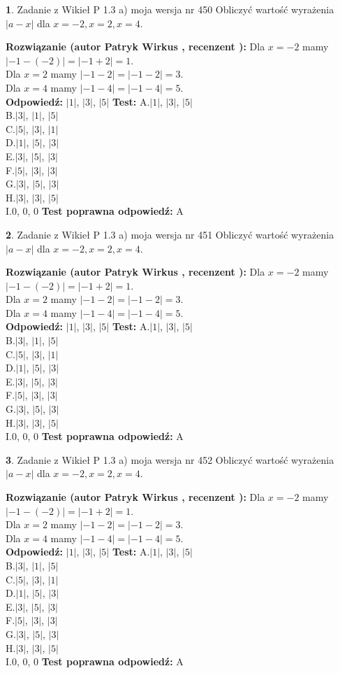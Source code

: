 \documentclass[12pt, a4paper]{article}
\theoremstyle{definition} %
\newtheorem{zad}{}
\newcommand{\zadStart}[1]{\begin{zad}#1\newline}
\newcommand{\zadStop}{\end{zad}}
\newcommand{\rozwStart}[2]{\noindent \textbf{Rozwiązanie (autor #1 , recenzent #2): }\newline}
\newcommand{\rozwStop}{\newline}
\newcommand{\odpStart}{\noindent \textbf{Odpowiedź:}\newline}
\newcommand{\odpStop}{\newline}
\newcommand{\testStart}{\noindent \textbf{Test:}\newline}
\newcommand{\testStop}{\newline}
\newcommand{\kluczStart}{\noindent \textbf{Test poprawna odpowiedź:}\newline}
\newcommand{\kluczStop}{\newline}
\begin{document}
\zadStart{Zadanie z Wikieł P 1.3 a) moja wersja nr 450}
Obliczyć wartość wyrażenia $|a - x|$ dla $x=-2,x=2,x=4$.
\zadStop
\rozwStart{Patryk Wirkus}{}
Dla $x = -2$ mamy $|-1 - (-2)| = |-1 + 2| = 1$.\\
Dla $x = 2$ mamy $|-1 - 2| = |-1 - 2| = 3$.\\
Dla $x = 4$ mamy $|-1 - 4| = |-1 - 4| = 5$.\\
\rozwStop
\odpStart
$|1|$, $|3|$, $|5|$
\odpStop
\testStart
A.$|1|$, $|3|$, $|5|$\\
B.$|3|$, $|1|$, $|5|$\\
C.$|5|$, $|3|$, $|1|$\\
D.$|1|$, $|5|$, $|3|$\\
E.$|3|$, $|5|$, $|3|$\\
F.$|5|$, $|3|$, $|3|$\\
G.$|3|$, $|5|$, $|3|$\\
H.$|3|$, $|3|$, $|5|$\\
I.$0$, $0$, $0$
\testStop
\kluczStart
A
\kluczStop



\zadStart{Zadanie z Wikieł P 1.3 a) moja wersja nr 451}
Obliczyć wartość wyrażenia $|a - x|$ dla $x=-2,x=2,x=4$.
\zadStop
\rozwStart{Patryk Wirkus}{}
Dla $x = -2$ mamy $|-1 - (-2)| = |-1 + 2| = 1$.\\
Dla $x = 2$ mamy $|-1 - 2| = |-1 - 2| = 3$.\\
Dla $x = 4$ mamy $|-1 - 4| = |-1 - 4| = 5$.\\
\rozwStop
\odpStart
$|1|$, $|3|$, $|5|$
\odpStop
\testStart
A.$|1|$, $|3|$, $|5|$\\
B.$|3|$, $|1|$, $|5|$\\
C.$|5|$, $|3|$, $|1|$\\
D.$|1|$, $|5|$, $|3|$\\
E.$|3|$, $|5|$, $|3|$\\
F.$|5|$, $|3|$, $|3|$\\
G.$|3|$, $|5|$, $|3|$\\
H.$|3|$, $|3|$, $|5|$\\
I.$0$, $0$, $0$
\testStop
\kluczStart
A
\kluczStop



\zadStart{Zadanie z Wikieł P 1.3 a) moja wersja nr 452}
Obliczyć wartość wyrażenia $|a - x|$ dla $x=-2,x=2,x=4$.
\zadStop
\rozwStart{Patryk Wirkus}{}
Dla $x = -2$ mamy $|-1 - (-2)| = |-1 + 2| = 1$.\\
Dla $x = 2$ mamy $|-1 - 2| = |-1 - 2| = 3$.\\
Dla $x = 4$ mamy $|-1 - 4| = |-1 - 4| = 5$.\\
\rozwStop
\odpStart
$|1|$, $|3|$, $|5|$
\odpStop
\testStart
A.$|1|$, $|3|$, $|5|$\\
B.$|3|$, $|1|$, $|5|$\\
C.$|5|$, $|3|$, $|1|$\\
D.$|1|$, $|5|$, $|3|$\\
E.$|3|$, $|5|$, $|3|$\\
F.$|5|$, $|3|$, $|3|$\\
G.$|3|$, $|5|$, $|3|$\\
H.$|3|$, $|3|$, $|5|$\\
I.$0$, $0$, $0$
\testStop
\kluczStart
A
\kluczStop
\end{document}
